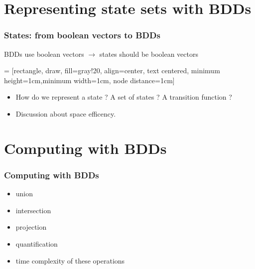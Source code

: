 \documentclass[10pt,a4paper]{beamer}
\begin{document}
\section{Representing  state sets with BDDs}
\begin{frame}[t]
\frametitle{States: from boolean vectors to BDDs}
	 BDDs use boolean vectors $\rightarrow$  states should be boolean vectors\\[0.5cm]\pause
	
	 = [rectangle, draw, fill=gray!20, align=center,
     text centered, minimum height=1cm,minimum width=1cm, node distance=1cm]	
	
	\begin{itemize}	
	\item How do we represent a state ? A set of states ? A transition function ?
	\item Discussion about space efficency.
	\end{itemize}
\end{frame}

\section{Computing with BDDs}
\begin{frame}
\frametitle{Computing with BDDs}

\begin{itemize}
\item union
\item intersection
\item projection
\item quantification
\item time complexity of these operations
\end{itemize}

\end{frame}
\end{document}
